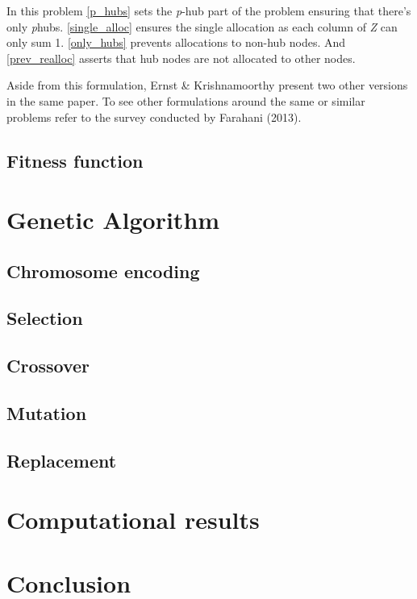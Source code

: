\documentclass[onecolumn]{IEEEtran}
\newcommand{\ip}{\emph{p}}
\begin{document}
In this problem \eqref{p_hubs} sets the \ip-hub part of the problem
ensuring that there's only \ip hubs. \eqref{single_alloc} ensures the single
allocation as each column of \emph{Z} can only sum 1. \eqref{only_hubs} prevents
allocations to non-hub nodes. And \eqref{prev_realloc} asserts that hub
nodes are not allocated to other nodes.

Aside from this formulation, Ernst \& Krishnamoorthy present two other versions in the
same paper\cite{Ernst1996}. To see other formulations around the same or similar problems
refer to the survey conducted by Farahani (2013)\cite{Farahani2013}.

\subsection{Fitness function}

%

\section{Genetic Algorithm}

\subsection{Chromosome encoding}

\subsection{Selection}

\subsection{Crossover}

\subsection{Mutation}

\subsection{Replacement}

\section{Computational results}

\section{Conclusion}



\end{document}
